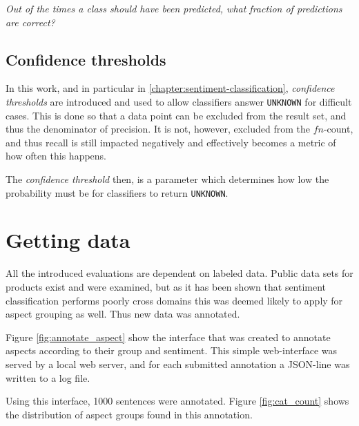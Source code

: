 \documentclass[a4paper,11pt]{kth-mag}
\begin{document}
\emph{Out of the times a class should have been predicted, what fraction of predictions are correct?}


\subsection{Confidence thresholds}
In this work, and in particular in \ref{chapter:sentiment-classification}, \emph{confidence thresholds} are
introduced and used to allow classifiers answer \texttt{UNKNOWN} for difficult cases.
This is done so that a data point can be excluded from the result set, and thus the denominator of precision.
It is not, however, excluded from the $fn$-count, and thus recall is still impacted negatively and effectively
becomes a metric of how often this happens.

The \emph{confidence threshold} then, is a parameter which determines how low the probability
must be for classifiers to return \texttt{UNKNOWN}.

\clearpage

\section{Getting data}
\label{subsec:getting_data}

All the introduced evaluations are dependent on labeled data. Public data sets for products exist and were examined,
but as it has been shown that sentiment classification performs poorly cross domains\cite{aue2005customizing}
this was deemed likely to apply for aspect grouping as well. Thus new data was annotated.

Figure \ref{fig:annotate_aspect} show the interface that was created to annotate aspects
according to their group and sentiment. This simple web-interface was served by a local web server,
and for each submitted annotation a JSON-line was written to a log file.

Using this interface, 1000 sentences were annotated.
Figure \ref{fig:cat_count} shows the distribution of aspect groups found in this annotation.
\end{document}
